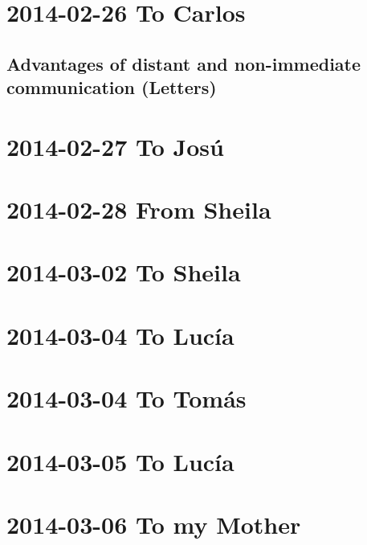 \documentclass[]{book}
\begin{document}
\hypertarget{to-carlos}{%
\section{2014-02-26 To Carlos}\label{to-carlos}}

\hypertarget{advantages-of-distant-and-non-immediate-communication-letters}{%
\subsection{Advantages of distant and non-immediate communication (Letters)}\label{advantages-of-distant-and-non-immediate-communication-letters}}

\hypertarget{to-josu}{%
\section{2014-02-27 To Josú}\label{to-josu}}

\hypertarget{from-sheila}{%
\section{2014-02-28 From Sheila}\label{from-sheila}}

\hypertarget{to-sheila-1}{%
\section{2014-03-02 To Sheila}\label{to-sheila-1}}

\hypertarget{to-lucia-1}{%
\section{2014-03-04 To Lucía}\label{to-lucia-1}}

\hypertarget{to-tomas-4}{%
\section{2014-03-04 To Tomás}\label{to-tomas-4}}

\hypertarget{to-lucia-2}{%
\section{2014-03-05 To Lucía}\label{to-lucia-2}}

\hypertarget{to-my-mother-1}{%
\section{2014-03-06 To my Mother}\label{to-my-mother-1}}
\end{document}
